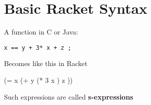 
\section{Basic Racket Syntax}

A function in C or Java:

\begin{verbatim}
x == y + 3* x + z ;
\end{verbatim}

Becomes like this in Racket

\begin{racketcode}
(= x (+ y (* 3 x ) z ))
\end{racketcode}

Such expressions are called \textbf{s-expressions}
